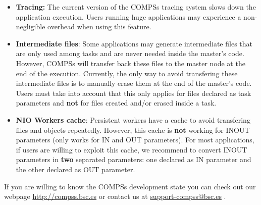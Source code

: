 \begin{itemize}
 \item \textbf{Tracing:} \newline The current version of the COMPSs tracing system slows down the application execution. Users
 running huge applications may experience a non-negligible overhead when using this feature. 
 
 \item \textbf{Intermediate files}: \newline Some applications may generate intermediate files that are only used among tasks
 and are never needed inside the master's code. However, COMPSs will transfer back these files to the master node at the end of the 
 execution. Currently, the only way to avoid transfering these intermediate files is to manually erase them at the end of the
 master's code. Users must take into account that this only applies for files declared as task parameters and \textbf{not} for files
 created and/or erased inside a task. 
 
 \item \textbf{NIO Workers cache}: \newline Persistent workers have a cache to avoid transfering files and objects repeatedly. 
 However, this cache is \textbf{not} working for INOUT parameters (only works for IN and OUT parameters). For most applications, 
 if users are willing to exploit this cache, we recommend to convert INOUT parameters in \textbf{two} separated parameters: one 
 declared as IN parameter and the other declared as OUT parameter.
 
\end{itemize}

If you are willing to know the COMPSs development state you can check out our webpage \url{http://compss.bsc.es} or 
contact us at \url{support-compss@bsc.es} .